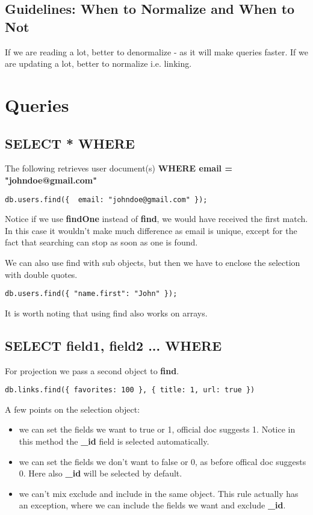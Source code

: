 \documentclass[a4paper, 12pt]{article}
\begin{document}
\subsection{Guidelines: When to Normalize and When to Not}
If we are reading a lot, better to denormalize - as it will make queries faster. If we are updating a lot, better to normalize i.e. linking.

\section{Queries}
\subsection{SELECT * WHERE}
The following retrieves user document(s) \textbf{WHERE email = "johndoe@gmail.com"}
\begin{verbatim}
db.users.find({  email: "johndoe@gmail.com" });
\end{verbatim}
Notice if we use \textbf{findOne} instead of \textbf{find}, we would have received the first match. In this case it wouldn't make much difference as email is unique, except for the fact that searching can stop as soon as one is found.

We can also use find with sub objects, but then we have to enclose the selection with double quotes.
\begin{verbatim}
db.users.find({ "name.first": "John" });
\end{verbatim}

It is worth noting that using find also works on arrays.
\subsection{SELECT field1, field2 ... WHERE}
For projection we pass a second object to \textbf{find}.
\begin{verbatim}
db.links.find({ favorites: 100 }, { title: 1, url: true })
\end{verbatim}
A few points on the selection object:
\begin{itemize}
	\item we can set the fields we want to true or 1, official doc suggests 1. Notice in this method the \textbf{\_id} field is selected automatically.	
	\item we can set the fields we don't want to false or 0, as before offical doc suggests 0. Here also \textbf{\_id} will be selected by default.
	\item we can't mix exclude and include in the same object. This rule actually has an exception, where we can include the fields we want and exclude \textbf{\_id}.
\end{itemize}
\end{document}
